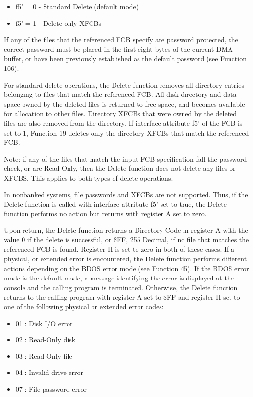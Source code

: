 \begin{itemize}
\item f5' = 0 - Standard Delete (default mode)
\item f5' = 1 - Delete only XFCBs
\end{itemize}

If any of the files that the referenced FCB specify are password
protected, the correct password must be placed in the first eight
bytes of the current DMA buffer, or have been previously established
as the default password (see Function 106).

For standard delete operations, the Delete function removes all
directory entries belonging to files that match the referenced
FCB. All disk directory and data space owned by the deleted files is
returned to free space, and becomes available for allocation to other
files. Directory XFCBs that were owned by the deleted files are also
removed from the directory. If interface attribute f5' of the FCB is
set to 1, Function 19 deletes only the directory XFCBs that match the
referenced FCB.

Note: if any of the files that match the input FCB specification fall
the password check, or are Read-Only, then the Delete function does
not delete any files or XFCBS.  This applies to both types of delete
operations.

In nonbanked systems, file passwords and XFCBs are not
supported. Thus, if the Delete function is called with interface
attribute f5' set to true, the Delete function performs no action but
returns with register A set to zero.

Upon return, the Delete function returns a Directory Code in register
A with the value 0 if the delete is successful, or \$FF, 255 Decimal,
if no file that matches the referenced FCB is found. Register H is set
to zero in both of these cases. If a physical, or extended error is
encountered, the Delete function performs different actions depending
on the BDOS error mode (see Function 45). If the BDOS error mode is
the default mode, a message identifying the error is displayed at the
console and the calling program is terminated. Otherwise, the Delete
function returns to the calling program with register A set to \$FF
and register H set to one of the following physical or extended error
codes:

\begin{itemize}
\item 01 : Disk I/O error
\item 02 : Read-Only disk
\item 03 : Read-Only file
\item 04 : Invalid drive error
\item 07 : File password error
\end{itemize}

